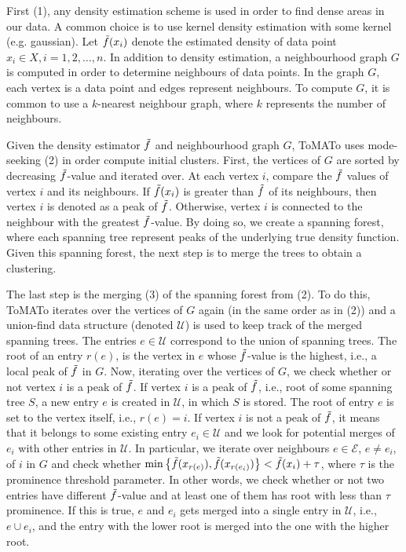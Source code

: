 First (1), any density estimation scheme is used in order to find dense areas in our data. A common choice is to use kernel density estimation with some kernel (e.g. gaussian). Let $\Tilde{f}(x_i)$ denote the estimated density of data point $x_i \in X, i = 1, 2, \ldots, n$. In addition to density estimation, a neighbourhood graph $G$ is computed in order to determine neighbours of data points. In the graph $G$, each vertex is a data point and edges represent neighbours. To compute $G$, it is common to use a $k$-nearest neighbour graph, where $k$ represents the number of neighbours.

Given the density estimator $\Tilde{f}$ and neighbourhood graph $G$, ToMATo uses mode-seeking (2) in order compute initial clusters. First, the vertices of $G$ are sorted by decreasing $\Tilde{f}$-value and iterated over. At each vertex $i$, compare the $\Tilde{f}$ values of vertex $i$ and its neighbours. If $\Tilde{f}(x_i)$ is greater than $\Tilde{f}$ of its neighbours, then vertex $i$ is denoted as a peak of $\Tilde{f}$. Otherwise, vertex $i$ is connected to the neighbour with the greatest  $\Tilde{f}$-value. By doing so, we create a spanning forest, where each spanning tree represent peaks of the underlying true density function. Given this spanning forest, the next step is to merge the trees to obtain a clustering.

The last step is the merging (3) of the spanning forest from (2). To do this, ToMATo iterates over the vertices of $G$ again (in the same order as in (2)) and a union-find data structure (denoted $\mathcal{U}$) is used to keep track of the merged spanning trees. The entries $e \in \mathcal{U}$ correspond to the union of spanning trees. The root of an entry $r(e)$, is the vertex in $e$ whose $\Tilde{f}$-value is the highest, i.e., a local peak of $\Tilde{f}$ in $G$. Now, iterating over the vertices of $G$, we check whether or not vertex $i$ is a peak of $\Tilde{f}$. If vertex $i$ is a peak of $\Tilde{f}$, i.e., root of some spanning tree $S$, a new entry $e$ is created in $\mathcal{U}$, in which $S$ is stored. The root of entry $e$ is set to the vertex itself, i.e., $r(e) = i$. If vertex $i$ is not a peak of $\Tilde{f}$, it means that it belongs to some existing entry $e_i \in \mathcal{U}$ and we look for potential merges of $e_i$ with other entries in $\mathcal{U}$. In particular, we iterate over neighbours $e \in \mathcal{E}$, $e \neq e_i$, of $i$ in $G$ and check whether $\min \left\{ \Tilde{f}(x_{r(e)}), \Tilde{f}(x_{r(e_i)}) \right\} < \Tilde{f}(x_i) + \tau$, where $\tau$ is the prominence threshold parameter. In other words, we check whether or not two entries have different $\Tilde{f}$-value and at least one of them has root with less than $\tau$ prominence. If this is true, $e$ and $e_i$ gets merged into a single entry in $\mathcal{U}$, i.e., $e \cup e_i$, and the entry with the lower root is merged into the one with the higher root.

